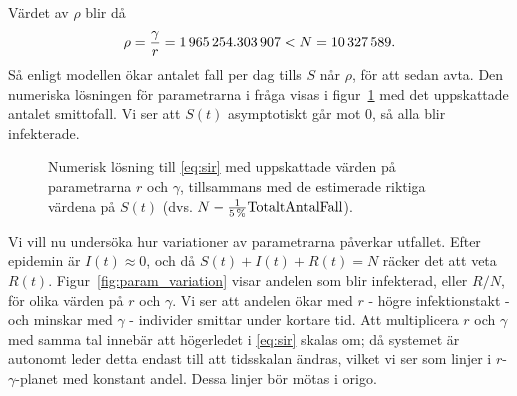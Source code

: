 \documentclass{article}
\begin{document}
Värdet av $\rho$ blir då
\def\rhoVal{1965254.303907}
$$ \rho = \frac\gamma r = \num{\rhoVal} < N = \num{\N}. $$
Så enligt modellen ökar antalet fall per dag tills $S$ når $\rho$,
för att sedan avta.
Den numeriska lösningen för parametrarna i fråga visas i figur~\ref{fig:sir_solution}
med det uppskattade antalet smittofall.
Vi ser att $S(t)$ asymptotiskt går mot $0$, så alla blir infekterade.

\begin{figure}
	\centering
	\caption{Numerisk lösning till \eqref{eq:sir} med uppskattade värden på parametrarna $r$ och $\gamma$,
	tillsammans med de estimerade riktiga värdena på $S(t)$
	(dvs. $N - \frac1{\SI5\percent} \text{TotaltAntalFall}$). \label{fig:sir_solution}}
\end{figure}

Vi vill nu undersöka hur variationer av parametrarna påverkar utfallet.
Efter epidemin är $I(t) \approx 0$, och då $S(t)+I(t)+R(t) = N$
räcker det att veta $R(t)$.
Figur~\ref{fig:param_variation} visar andelen som blir infekterad, eller $R/N$,
för olika värden på $r$ och $\gamma$.
Vi ser att andelen ökar med $r$ - högre infektionstakt -
och minskar med $\gamma$ - individer smittar under kortare tid.
Att multiplicera $r$ och $\gamma$ med samma tal innebär att
högerledet i \eqref{eq:sir} skalas om;
då systemet är autonomt leder detta endast till att tidsskalan ändras,
vilket vi ser som linjer i $r$\nobreakdash-$\gamma$\nobreakdash-planet med konstant andel.
Dessa linjer bör mötas i origo.
\end{document}
